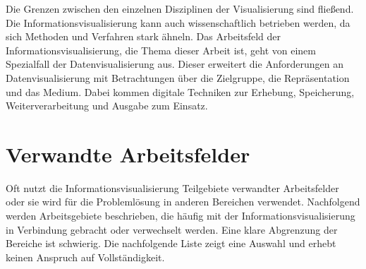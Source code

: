 \documentclass[a4paper, 
               12pt,
               DIV=calc,
               version=first,
               pdftex,
               headsepline,
               footsepline,
               bibtotocnumbered,
               liststotocnumbered]{scrreprt}
\begin{document}
Die Grenzen zwischen den einzelnen Disziplinen der Visualisierung sind fließend. Die Informationsvisualisierung kann
auch wissenschaftlich betrieben werden, da sich Methoden und Verfahren stark ähneln.
Das Arbeitsfeld der Informationsvisualisierung, die Thema dieser Arbeit ist,
geht von einem Spezialfall der Datenvisualisierung aus. Dieser erweitert die Anforderungen an Datenvisualisierung mit
Betrachtungen über die Zielgruppe, die Repräsentation und das Medium. Dabei kommen digitale
Techniken zur Erhebung, Speicherung, Weiterverarbeitung und Ausgabe zum Einsatz.

\section{Verwandte Arbeitsfelder}
\label{sec:Arbeitsfelder}
Oft nutzt die Informationsvisualisierung Teilgebiete verwandter Arbeitsfelder oder sie wird für die Problemlösung
in anderen Bereichen verwendet.
Nachfolgend werden Arbeitsgebiete beschrieben, die häufig mit der Informationsvisualisierung in Verbindung
gebracht oder verwechselt werden. Eine klare Abgrenzung der Bereiche ist schwierig. Die nachfolgende Liste zeigt
eine Auswahl und erhebt keinen Anspruch auf Vollständigkeit.
\end{document}
